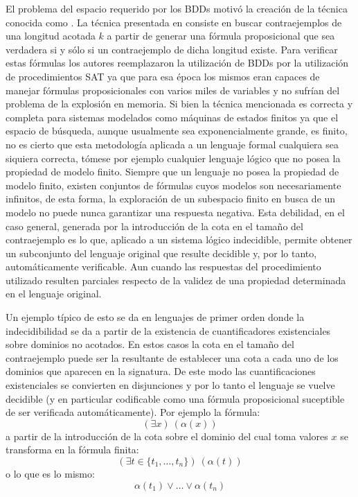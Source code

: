 El problema del espacio requerido por los BDDs motivó la creación de la
técnica conocida como \bmc\cite{Biere:1999:SMC:646483.691738}. La técnica
presentada en \cite{Biere:1999:SMC:646483.691738} consiste en buscar
contraejemplos de una longitud acotada $k$ a partir de generar una fórmula
proposicional que sea verdadera si y sólo si un contraejemplo de dicha
longitud existe. Para verificar estas fórmulas los autores reemplazaron la
utilización de BDDs por la utilización de procedimientos SAT ya que para esa
época los mismos eran capaces de manejar fórmulas proposicionales con varios
miles de variables y no sufrían del problema de la explosión en memoria. Si
bien la técnica mencionada es correcta y completa para sistemas modelados como
máquinas de estados finitos ya que el espacio de búsqueda, aunque usualmente
sea exponencialmente grande, es finito, no es cierto que esta metodología
aplicada a un lenguaje formal cualquiera sea siquiera correcta, tómese por
ejemplo cualquier lenguaje lógico que no posea la propiedad de modelo finito.
Siempre que un lenguaje no posea la propiedad de modelo finito, existen
conjuntos de fórmulas cuyos modelos son necesariamente infinitos, de esta
forma, la exploración de un subespacio finito en busca de un modelo no puede
nunca garantizar una respuesta negativa. Esta debilidad, en el caso general,
generada por la introducción de la cota en el tamaño del contraejemplo es lo
que, aplicado a un sistema lógico indecidible, permite obtener un subconjunto
del lenguaje original que resulte decidible y, por lo tanto, automáticamente
verificable. Aun cuando las respuestas del procedimiento utilizado resulten
parciales respecto de la validez de una propiedad determinada en el lenguaje
original.

Un ejemplo típico de esto se da en lenguajes de primer orden donde la
indecidibilidad se da a partir de la existencia de cuantificadores
existenciales sobre dominios no acotados. En estos casos la cota en el tamaño
del contraejemplo puede ser la resultante de establecer una cota a cada uno de
los dominios que aparecen en la signatura. De este modo las cuantificaciones
existenciales se convierten en disjunciones y por lo tanto el lenguaje se
vuelve decidible (y en particular codificable como una fórmula proposicional
suceptible de ser verificada automáticamente). Por ejemplo la fórmula:
\begin{equation}(\exists x)\ (\alpha(x))\end{equation}  \noindent a partir de
la introducción de la cota sobre el dominio del cual toma valores $x$ se
transforma en la fórmula finita:  \begin{equation}\left(\exists t \in
\{t_1,\ldots,t_n\}\right)\ \left(\alpha(t)\right)\end{equation}  \noindent o
lo que es lo mismo:  \begin{equation} \alpha(t_1) \vee \ldots \vee
\alpha(t_n)\end{equation}

